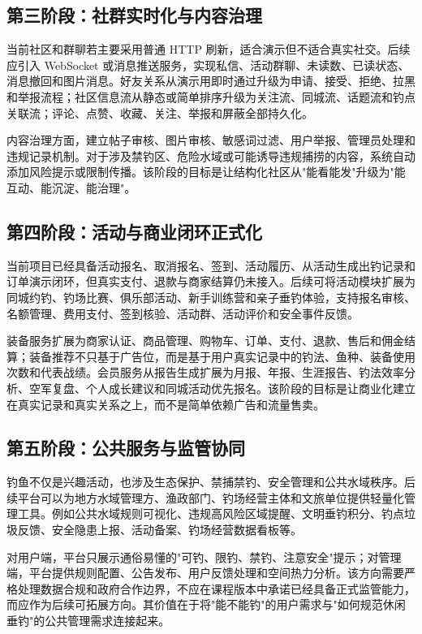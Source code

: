 \subsection{第三阶段：社群实时化与内容治理}

当前社区和群聊若主要采用普通 HTTP 刷新，适合演示但不适合真实社交。后续应引入 WebSocket 或消息推送服务，实现私信、活动群聊、未读数、已读状态、消息撤回和图片消息。好友关系从演示用即时通过升级为申请、接受、拒绝、拉黑和举报流程；社区信息流从静态或简单排序升级为关注流、同城流、话题流和钓点关联流；评论、点赞、收藏、关注、举报和屏蔽全部持久化。

内容治理方面，建立帖子审核、图片审核、敏感词过滤、用户举报、管理员处理和违规记录机制。对于涉及禁钓区、危险水域或可能诱导违规捕捞的内容，系统自动添加风险提示或限制传播。该阶段的目标是让结构化社区从"能看能发"升级为"能互动、能沉淀、能治理"。

\subsection{第四阶段：活动与商业闭环正式化}

当前项目已经具备活动报名、取消报名、签到、活动履历、从活动生成出钓记录和订单演示闭环，但真实支付、退款与商家结算仍未接入。后续可将活动模块扩展为同城约钓、钓场比赛、俱乐部活动、新手训练营和亲子垂钓体验，支持报名审核、名额管理、费用支付、签到核验、活动群、活动评价和安全事件反馈。

装备服务扩展为商家认证、商品管理、购物车、订单、支付、退款、售后和佣金结算；装备推荐不只基于广告位，而是基于用户真实记录中的钓法、鱼种、装备使用次数和代表战绩。会员服务从报告生成扩展为月报、年报、生涯报告、钓法效率分析、空军复盘、个人成长建议和同城活动优先报名。该阶段的目标是让商业化建立在真实记录和真实关系之上，而不是简单依赖广告和流量售卖。

\subsection{第五阶段：公共服务与监管协同}

钓鱼不仅是兴趣活动，也涉及生态保护、禁捕禁钓、安全管理和公共水域秩序。后续平台可以为地方水域管理方、渔政部门、钓场经营主体和文旅单位提供轻量化管理工具。例如公共水域规则可视化、违规高风险区域提醒、文明垂钓积分、钓点垃圾反馈、安全隐患上报、活动备案、钓场经营数据看板等。

对用户端，平台只展示通俗易懂的"可钓、限钓、禁钓、注意安全"提示；对管理端，平台提供规则配置、公告发布、用户反馈处理和空间热力分析。该方向需要严格处理数据合规和政府合作边界，不应在课程版本中承诺已经具备正式监管能力，而应作为后续可拓展方向。其价值在于将"能不能钓"的用户需求与"如何规范休闲垂钓"的公共管理需求连接起来。

